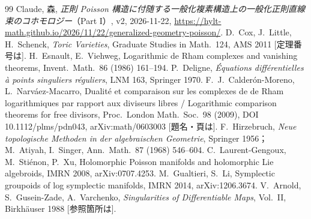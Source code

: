\begin{thebibliography}{99}\small
{} Claude, 森, \emph{正則 Poisson 構造に付随する一般化複素構造上の一般化正則直線束のコホモロジー}（Part I）, v2, 2026-11-22, \url{https://hylt-math.github.io/2026/11/22/generalized-geometry-poisson/}.
 D.\ Cox, J.\ Little, H.\ Schenck, \emph{Toric Varieties}, Graduate Studies in Math.\ 124, AMS 2011 [定理番号は\tQ].
 H.\ Esnault, E.\ Viehweg, Logarithmic de Rham complexes and vanishing theorems, Invent.\ Math.\ 86 (1986) 161--194.
 P.\ Deligne, \emph{\'Equations diff\'erentielles \`a points singuliers r\'eguliers}, LNM 163, Springer 1970.
 F.\ J.\ Calder\'on-Moreno, L.\ Narv\'aez-Macarro, Dualit\'e et comparaison sur les complexes de de Rham logarithmiques par rapport aux diviseurs libres / Logarithmic comparison theorems for free divisors, Proc.\ London Math.\ Soc.\ 98 (2009), DOI 10.1112/plms/pdn043, arXiv:math/0603003 [題名・頁は\tQ].
 F.\ Hirzebruch, \emph{Neue topologische Methoden in der algebraischen Geometrie}, Springer 1956；M.\ Atiyah, I.\ Singer, Ann.\ Math.\ 87 (1968) 546--604.
 C.\ Laurent-Gengoux, M.\ Sti\'enon, P.\ Xu, Holomorphic Poisson manifolds and holomorphic Lie algebroids, IMRN 2008, arXiv:0707.4253.
 M.\ Gualtieri, S.\ Li, Symplectic groupoids of log symplectic manifolds, IMRN 2014, arXiv:1206.3674.
 V.\ Arnold, S.\ Gusein-Zade, A.\ Varchenko, \emph{Singularities of Differentiable Maps}, Vol.\ II, Birkh\"auser 1988 [参照箇所は\tQ].
\end{thebibliography}
